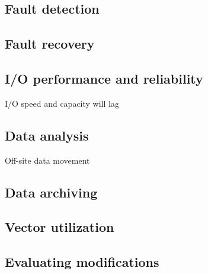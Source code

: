 \documentclass{article}
\begin{document}
\subsection{Fault detection} \label{issue:fault-detect}
\subsection{Fault recovery} \label{issue:fault-recover}
\subsection{I/O performance and reliability} \label{issue:data-io}
   I/O speed and capacity will lag
\subsection{Data analysis} \label{issue:data-analyse}
   Off-site data movement
\subsection{Data archiving}\label{issue:data-archive}
\subsection{Vector utilization} \label{issue:code-vectorize}
\subsection{Evaluating modifications}\label{issue:performance-measure}
\end{document}

